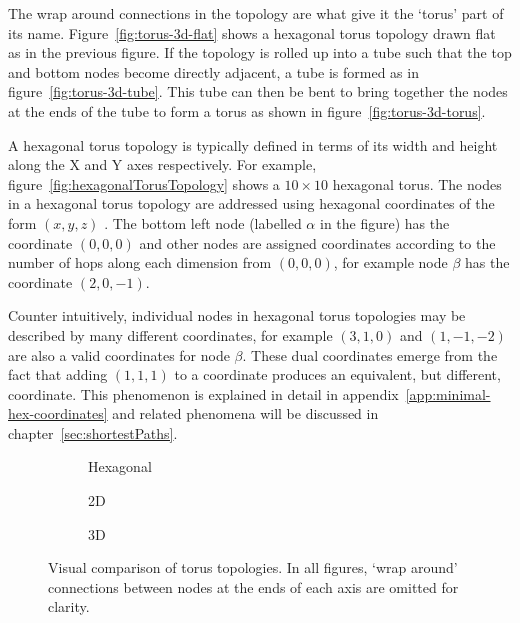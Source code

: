 		The wrap around connections in the topology are what give it the `torus'
		part of its name. Figure~\ref{fig:torus-3d-flat} shows a hexagonal torus
		topology drawn flat as in the previous figure. If the topology is rolled up
		into a tube such that the top and bottom nodes become directly adjacent, a
		tube is formed as in figure~\ref{fig:torus-3d-tube}. This tube can then be
		bent to bring together the nodes at the ends of the tube to form a torus as
		shown in figure~\ref{fig:torus-3d-torus}.
		
		A hexagonal torus topology is typically defined in terms of its width and
		height along the X and Y axes respectively. For example,
		figure~\ref{fig:hexagonalTorusTopology} shows a $10\times10$ hexagonal
		torus.  The nodes in a hexagonal torus topology are addressed using
		hexagonal coordinates of the form $(x, y, z)$ \cite{patel15}. The bottom
		left node (labelled $\alpha$ in the figure) has the coordinate $(0, 0, 0)$
		and other nodes are assigned coordinates according to the number of hops
		along each dimension from $(0, 0, 0)$, for example node $\beta$ has the
		coordinate $(2, 0, -1)$.
		
		Counter intuitively, individual nodes in hexagonal torus topologies may be
		described by many different coordinates, for example $(3, 1, 0)$ and $(1,
		-1, -2)$ are also a valid coordinates for node $\beta$. These dual
		coordinates emerge from the fact that adding $(1, 1, 1)$ to a coordinate
		produces an equivalent, but different, coordinate. This phenomenon is
		explained in detail in appendix~\ref{app:minimal-hex-coordinates} and
		related phenomena will be discussed in chapter~\ref{sec:shortestPaths}.
		
		\begin{figure}
			\center
			\begin{subfigure}[b]{0.32\linewidth}
				\center
				
				\caption{Hexagonal}
				\label{fig:torus-compare-hexagonal}
			\end{subfigure}
			\begin{subfigure}[b]{0.32\linewidth}
				\center
				
				\caption{2D}
				\label{fig:torus-compare-2d}
			\end{subfigure}
			\begin{subfigure}[b]{0.32\linewidth}
				\center
				
				\caption{3D}
				\label{fig:torus-compare-3d}
			\end{subfigure}
			
			\caption{Visual comparison of torus topologies. In all figures, `wrap
			around' connections between nodes at the ends of each axis are omitted
			for clarity.}
			\label{fig:torus-compare}
		\end{figure}
		
